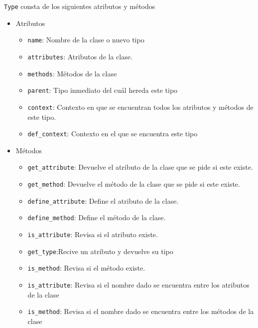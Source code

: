   \verb|Type| consta de los siguientes atributos y m\'etodos 
  \begin{itemize}
  \item Atributos
  \begin{itemize}
  \item \verb|name|: Nombre de la clase o nuevo tipo
  
  \item \verb|attributes|: Atributos de la clase.
  
  \item  \verb|methods|: M\'etodos de la clase
  
  \item \verb|parent|: Tipo inmediato del cuál hereda este tipo
  
  \item \verb|context|: Contexto en que se encuentran todos los atributos y métodos de este tipo. 
  
  \item \verb|def_context|: Contexto en el que se encuentra este tipo
  \end{itemize}
  
  \item M\'etodos
  \begin{itemize}
  \item \verb|get_attribute|:  Devuelve el atributo de la clase que se pide si este existe.
  
  \item \verb|get_method|: Devuelve el m\'etodo de la clase que se pide si este existe.
  
  \item \verb|define_attribute|: Define el atributo de la clase.
  
  \item \verb|define_method|: Define el m\'etodo de la clase.
  
  \item \verb|is_attribute|: Revisa si el atributo existe.
  
  \item \verb|get_type|:Recive un atributo y devuelve su tipo
  
  \item \verb|is_method|: Revisa si el m\'etodo existe.
  
  \item \verb|is_attribute|: Revisa si el nombre dado se encuentra entre los atributos de la clase
  
  \item \verb|is_method|: Revisa si el nombre dado se encuentra entre los m\'etodos de la clase
  \end{itemize}
  \end{itemize}

